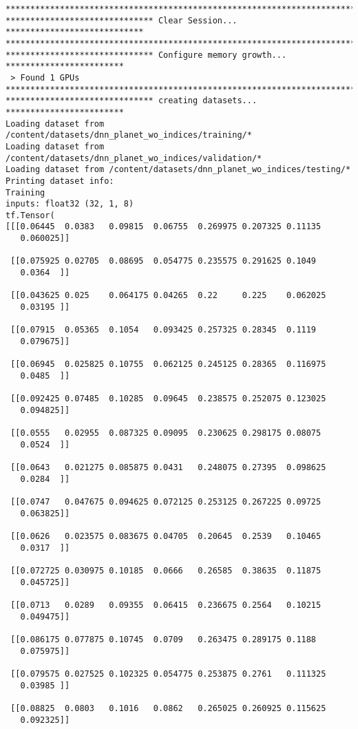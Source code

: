 \documentclass[
  letterpaper,
  DIV=11,
  numbers=noendperiod]{scrreprt}
\begin{document}
\begin{verbatim}
****************************************************************************
****************************** Clear Session... ****************************
****************************************************************************
****************************** Configure memory growth... ************************
 > Found 1 GPUs
****************************************************************************
****************************** creating datasets... ************************
Loading dataset from /content/datasets/dnn_planet_wo_indices/training/*
Loading dataset from /content/datasets/dnn_planet_wo_indices/validation/*
Loading dataset from /content/datasets/dnn_planet_wo_indices/testing/*
Printing dataset info:
Training
inputs: float32 (32, 1, 8)
tf.Tensor(
[[[0.06445  0.0383   0.09815  0.06755  0.269975 0.207325 0.11135
   0.060025]]

 [[0.075925 0.02705  0.08695  0.054775 0.235575 0.291625 0.1049
   0.0364  ]]

 [[0.043625 0.025    0.064175 0.04265  0.22     0.225    0.062025
   0.03195 ]]

 [[0.07915  0.05365  0.1054   0.093425 0.257325 0.28345  0.1119
   0.079675]]

 [[0.06945  0.025825 0.10755  0.062125 0.245125 0.28365  0.116975
   0.0485  ]]

 [[0.092425 0.07485  0.10285  0.09645  0.238575 0.252075 0.123025
   0.094825]]

 [[0.0555   0.02955  0.087325 0.09095  0.230625 0.298175 0.08075
   0.0524  ]]

 [[0.0643   0.021275 0.085875 0.0431   0.248075 0.27395  0.098625
   0.0284  ]]

 [[0.0747   0.047675 0.094625 0.072125 0.253125 0.267225 0.09725
   0.063825]]

 [[0.0626   0.023575 0.083675 0.04705  0.20645  0.2539   0.10465
   0.0317  ]]

 [[0.072725 0.030975 0.10185  0.0666   0.26585  0.38635  0.11875
   0.045725]]

 [[0.0713   0.0289   0.09355  0.06415  0.236675 0.2564   0.10215
   0.049475]]

 [[0.086175 0.077875 0.10745  0.0709   0.263475 0.289175 0.1188
   0.075975]]

 [[0.079575 0.027525 0.102325 0.054775 0.253875 0.2761   0.111325
   0.03985 ]]

 [[0.08825  0.0803   0.1016   0.0862   0.265025 0.260925 0.115625
   0.092325]]


\end{verbatim}
\end{document}
